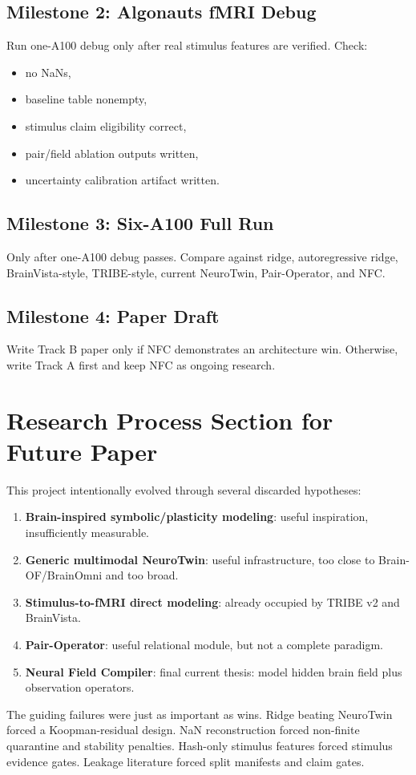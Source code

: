 \documentclass[11pt]{article}
\begin{document}
\subsection{Milestone 2: Algonauts fMRI Debug}
Run one-A100 debug only after real stimulus features are verified. Check:
\begin{itemize}
\item no NaNs,
\item baseline table nonempty,
\item stimulus claim eligibility correct,
\item pair/field ablation outputs written,
\item uncertainty calibration artifact written.
\end{itemize}

\subsection{Milestone 3: Six-A100 Full Run}
Only after one-A100 debug passes. Compare against ridge, autoregressive ridge, BrainVista-style, TRIBE-style, current NeuroTwin, Pair-Operator, and NFC.

\subsection{Milestone 4: Paper Draft}
Write Track B paper only if NFC demonstrates an architecture win. Otherwise, write Track A first and keep NFC as ongoing research.

\section{Research Process Section for Future Paper}

This project intentionally evolved through several discarded hypotheses:
\begin{enumerate}
\item \textbf{Brain-inspired symbolic/plasticity modeling}: useful inspiration, insufficiently measurable.
\item \textbf{Generic multimodal NeuroTwin}: useful infrastructure, too close to Brain-OF/BrainOmni and too broad.
\item \textbf{Stimulus-to-fMRI direct modeling}: already occupied by TRIBE v2 and BrainVista.
\item \textbf{Pair-Operator}: useful relational module, but not a complete paradigm.
\item \textbf{Neural Field Compiler}: final current thesis: model hidden brain field plus observation operators.
\end{enumerate}
The guiding failures were just as important as wins. Ridge beating NeuroTwin forced a Koopman-residual design. NaN reconstruction forced non-finite quarantine and stability penalties. Hash-only stimulus features forced stimulus evidence gates. Leakage literature forced split manifests and claim gates.
\end{document}
